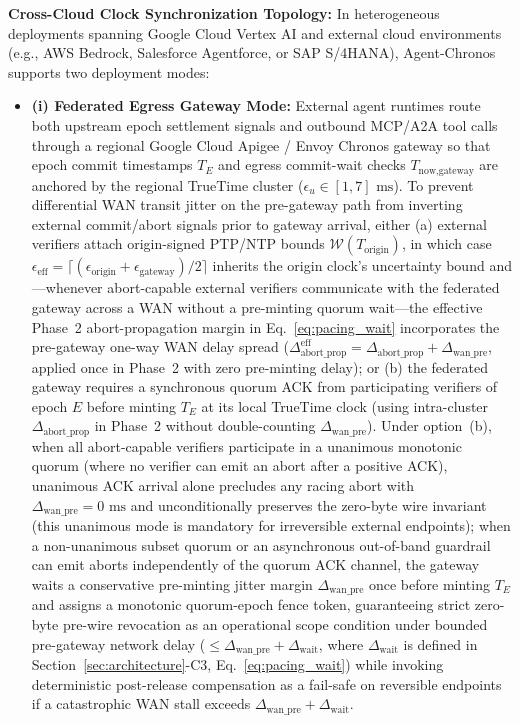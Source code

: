 \documentclass[conference,10pt]{IEEEtran}
\begin{document}
\textbf{Cross-Cloud Clock Synchronization Topology:} In heterogeneous deployments spanning Google Cloud Vertex AI and external cloud environments (e.g., AWS Bedrock, Salesforce Agentforce, or SAP S/4HANA), Agent-Chronos supports two deployment modes:
\begin{itemize}
    \item \textbf{(i) Federated Egress Gateway Mode:} External agent runtimes route both upstream epoch settlement signals and outbound MCP/A2A tool calls through a regional Google Cloud Apigee / Envoy Chronos gateway so that epoch commit timestamps $T_E$ and egress commit-wait checks $T_{\text{now},\text{gateway}}$ are anchored by the regional TrueTime cluster ($\epsilon_u \in [1, 7]\text{ ms}$). To prevent differential WAN transit jitter on the pre-gateway path from inverting external commit/abort signals prior to gateway arrival, either (a) external verifiers attach origin-signed PTP/NTP bounds $\mathcal{W}(T_{\text{origin}})$, in which case $\epsilon_{\text{eff}} = \lceil (\epsilon_{\text{origin}} + \epsilon_{\text{gateway}})/2 \rceil$ inherits the origin clock's uncertainty bound and---whenever abort-capable external verifiers communicate with the federated gateway across a WAN without a pre-minting quorum wait---the effective Phase~2 abort-propagation margin in Eq.~\eqref{eq:pacing_wait} incorporates the pre-gateway one-way WAN delay spread ($\Delta_{\text{abort\_prop}}^{\text{eff}} = \Delta_{\text{abort\_prop}} + \Delta_{\text{wan\_pre}}$, applied once in Phase~2 with zero pre-minting delay); or (b) the federated gateway requires a synchronous quorum ACK from participating verifiers of epoch $E$ before minting $T_E$ at its local TrueTime clock (using intra-cluster $\Delta_{\text{abort\_prop}}$ in Phase~2 without double-counting $\Delta_{\text{wan\_pre}}$). Under option~(b), when all abort-capable verifiers participate in a unanimous monotonic quorum (where no verifier can emit an abort after a positive ACK), unanimous ACK arrival alone precludes any racing abort with $\Delta_{\text{wan\_pre}} = 0\text{ ms}$ and unconditionally preserves the zero-byte wire invariant (this unanimous mode is mandatory for irreversible external endpoints); when a non-unanimous subset quorum or an asynchronous out-of-band guardrail can emit aborts independently of the quorum ACK channel, the gateway waits a conservative pre-minting jitter margin $\Delta_{\text{wan\_pre}}$ once before minting $T_E$ and assigns a monotonic quorum-epoch fence token, guaranteeing strict zero-byte pre-wire revocation as an operational scope condition under bounded pre-gateway network delay ($\le \Delta_{\text{wan\_pre}} + \Delta_{\text{wait}}$, where $\Delta_{\text{wait}}$ is defined in Section~\ref{sec:architecture}-C3, Eq.~\eqref{eq:pacing_wait}) while invoking deterministic post-release compensation as a fail-safe on reversible endpoints if a catastrophic WAN stall exceeds $\Delta_{\text{wan\_pre}} + \Delta_{\text{wait}}$.

\end{itemize}
\end{document}
